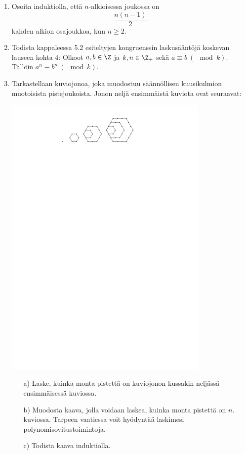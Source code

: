 \begin{enumerate}
\item
Osoita induktiolla, että $n$-alkioisessa joukossa on
\[
\frac{n(n-1)}{2}
\]
kahden alkion osajoukkoa, kun $n \ge 2$.

\item Todista kappaleessa 5.2 esiteltyjen kongruenssin laskusääntöjä koskevan lauseen kohta 4: Olkoot $a, b \in \Z$ ja $k,n \in \Z_+$ sekä $a \equiv b\ (\mod k)$. Tällöin $a^n \equiv b^n\ (\mod k)$.

\item Tarkastellaan kuviojonoa, joka muodostuu säännöllisen kuusikulmion muotoisista pistejoukoista. Jonon neljä ensimmäistä kuviota ovat seuraavat:

\begin{center}
\includegraphics[width=10cm]{pictures/Kappale5_4_kuusikulm_v2}
\end{center}


\begin{itemize}
\item[a)] Laske, kuinka monta pistettä on kuviojonon kussakin neljässä ensimmäisessä kuviossa.
\item[b)] Muodosta kaava, jolla voidaan laskea, kuinka monta pistettä on $n$. kuviossa. Tarpeen vaatiessa voit hyödyntää laskimesi polynomisovitustoimintoja.
\item[c)] Todista kaava induktiolla.
\end{itemize}

\end{enumerate}

